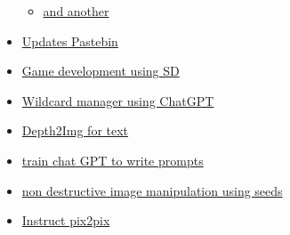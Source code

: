 \begin{itemize}
  \begin{itemize}
   
  \item
    \href{https://civitai.com/models/1253/anthro}{and another}
  \end{itemize}
\item
  \href{https://rentry.org/sdupdates3}{Updates Pastebin}
\item
  \href{https://www.heroo.ai/}{Game development using SD}
\item
  \href{https://github.com/mattjaybe/sd-wildcards}{Wildcard manager
  using ChatGPT}
\item
  \href{https://www.reddit.com/r/StableDiffusion/comments/10c9kg8/depth2img_works_well_for_text_inputs/}{Depth2Img
  for text}
\item
  \href{https://dreamlike.art/guides/using-openai-chat-gpt-to-write-stable-diffusion-prompts}{train
  chat GPT to write prompts}
\item
  \href{https://www.reddit.com/r/StableDiffusion/comments/10no6tp/non_destructive_image_variation_in_text2image/}{non
  destructive image manipulation using seeds}
\item
  \href{https://www.reddit.com/r/StableDiffusion/comments/10l74sl/instruct_pix2pix_is_amazing_inpaintingimg2img/}{Instruct
  pix2pix}

  \begin{itemize}
   

\end{itemize}
\end{itemize}
